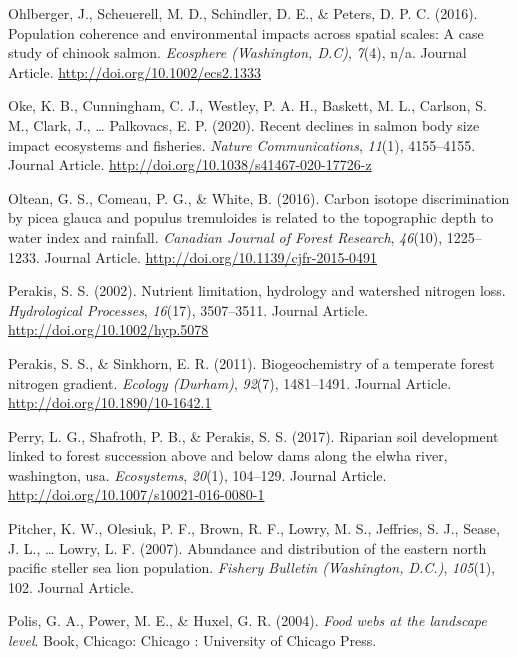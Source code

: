 \documentclass [11pt, proquest] {uwthesis}[2015/03/03]
\begin{document}
\hypertarget{ref-Ohlberger2016}{}
Ohlberger, J., Scheuerell, M. D., Schindler, D. E., \& Peters, D. P. C.
(2016). Population coherence and environmental impacts across spatial
scales: A case study of chinook salmon. \emph{Ecosphere (Washington,
D.C)}, \emph{7}(4), n/a. Journal Article.
\url{http://doi.org/10.1002/ecs2.1333}

\hypertarget{ref-Oke2020}{}
Oke, K. B., Cunningham, C. J., Westley, P. A. H., Baskett, M. L.,
Carlson, S. M., Clark, J., \ldots{} Palkovacs, E. P. (2020). Recent
declines in salmon body size impact ecosystems and fisheries.
\emph{Nature Communications}, \emph{11}(1), 4155--4155. Journal Article.
\url{http://doi.org/10.1038/s41467-020-17726-z}

\hypertarget{ref-Oltean2016}{}
Oltean, G. S., Comeau, P. G., \& White, B. (2016). Carbon isotope
discrimination by picea glauca and populus tremuloides is related to the
topographic depth to water index and rainfall. \emph{Canadian Journal of
Forest Research}, \emph{46}(10), 1225--1233. Journal Article.
\url{http://doi.org/10.1139/cjfr-2015-0491}

\hypertarget{ref-Perakis2002}{}
Perakis, S. S. (2002). Nutrient limitation, hydrology and watershed
nitrogen loss. \emph{Hydrological Processes}, \emph{16}(17), 3507--3511.
Journal Article. \url{http://doi.org/10.1002/hyp.5078}

\hypertarget{ref-Perakis2011}{}
Perakis, S. S., \& Sinkhorn, E. R. (2011). Biogeochemistry of a
temperate forest nitrogen gradient. \emph{Ecology (Durham)},
\emph{92}(7), 1481--1491. Journal Article.
\url{http://doi.org/10.1890/10-1642.1}

\hypertarget{ref-Perry2017}{}
Perry, L. G., Shafroth, P. B., \& Perakis, S. S. (2017). Riparian soil
development linked to forest succession above and below dams along the
elwha river, washington, usa. \emph{Ecosystems}, \emph{20}(1), 104--129.
Journal Article. \url{http://doi.org/10.1007/s10021-016-0080-1}

\hypertarget{ref-Pitcher2007}{}
Pitcher, K. W., Olesiuk, P. F., Brown, R. F., Lowry, M. S., Jeffries, S.
J., Sease, J. L., \ldots{} Lowry, L. F. (2007). Abundance and
distribution of the eastern north pacific steller sea lion population.
\emph{Fishery Bulletin (Washington, D.C.)}, \emph{105}(1), 102. Journal
Article.

\hypertarget{ref-Polis2004}{}
Polis, G. A., Power, M. E., \& Huxel, G. R. (2004). \emph{Food webs at
the landscape level}. Book, Chicago: Chicago : University of Chicago
Press.
\end{document}
